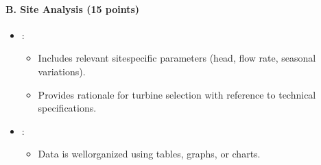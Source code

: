 \documentclass[letterpaper,10pt,english]{jupyterBook}
\begin{document}
\paragraph{B. Site Analysis (15 points)}
\label{\detokenize{ProjectInstructions:b-site-analysis-15-points}}\begin{itemize}
\item {} 
\sphinxAtStartPar
{}:
\begin{itemize}
\item {} 
\sphinxAtStartPar
Includes relevant site\sphinxhyphen{}specific parameters (head, flow rate,
seasonal variations).

\item {} 
\sphinxAtStartPar
Provides rationale for turbine selection with reference to
technical specifications.

\end{itemize}

\item {} 
\sphinxAtStartPar
{}:
\begin{itemize}
\item {} 
\sphinxAtStartPar
Data is well\sphinxhyphen{}organized using tables, graphs, or charts.

\end{itemize}

\end{itemize}
\end{document}
